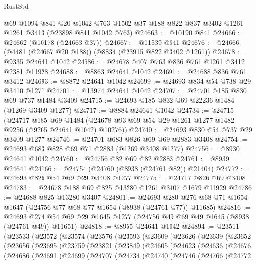 \begin{lexlean}{RustStd}
\begin{coremodule}
    @69
    @1094
    @841
    @20
    @1042
    @763
    @1502
    @37
    @188
    @822
    @837
    @3402
    @1261
    @1261
    @3413
    (@23898 @841 @1042 @763)
@24663 := @10190 @841
@24666 := @24662 (@10178 (@24663 @37))
@24667 := @11539 @841
@24676 := @24666 (@4481 (@24667 @20 @188)) (@8834 (@23915 @822 @3402 @1261))
@24678 := @9335 @24641 @1042
@24686 := @24678 @407 @763 @836 @761 @1261 @3412 @2381 @11928
@24688 := @8863 @24641 @1042
@24691 := @24688 @836 @761 @3412
@24693 := @8872 @24641 @1042
@24699 := @24693 @834 @54 @738 @29 @3410 @1277
@24701 := @13974 @24641 @1042
@24707 := @24701 @185 @830 @69 @737 @1484 @3409
@24715 := @24693 @185 @832 @69 @22236 @1484 (@1269 @3409 @1277)
@24717 := @8884 @24641 @1042
@24734 := @24715
    (@24717
      @185
      @69
      @1484
      (@24678 @93 @69 @54 @29 @1261 @1277 @1482 @9256 (@9265 @24641 @1042) @10276))
@24740 := @24693 @830 @54 @737 @29 @3409 @1277
@24746 := @24701 @683 @826 @69 @69 @2883 @3408
@24754 := @24693 @683 @828 @69 @71 @2883 (@1269 @3408 @1277)
@24756 := @8930 @24641 @1042
@24760 := @24756 @82 @69 @82 @2883
@24761 := @8939 @24641
@24766 := @24754 (@24760 (@8938 (@24761 @82)) @21404)
@24772 := @24693 @826 @54 @69 @29 @3408 @1277
@24775 := @24717 @826 @69 @3408
@24783 := @24678 @188 @69 @825 @13280 @1261 @3407 @1679 @11929
@24786 := @24688 @825 @13280 @3407
@24801 := @24693
    @280
    @276
    @68
    @71
    @1654
    @1647
    (@24756 @77 @68 @77 @1654 (@8938 (@24761 @77)) @11685)
@24816 := @24693 @274 @54 @69 @29 @1645 @1277 (@24756 @49 @69 @49 @1645 (@8938 (@24761 @49)) @11651)
@24818 := @8955 @24641 @1042
@24894 := @23511
    (@23533
      (@23572
        (@23574
          (@23576
            (@23593
              (@23609
                (@23626
                  (@23639
                    (@23652
                      (@23656
                        (@23695
                          (@23759
                            (@23821
                              (@23849
                                (@24605
                                  (@24623
                                    (@24636
                                      (@24676
                                        (@24686
                                          (@24691
                                            (@24699
                                              (@24707
                                                (@24734
                                                  (@24740
                                                    (@24746
                                                      (@24766
                                                        (@24772

\end{coremodule}
\end{lexlean}
